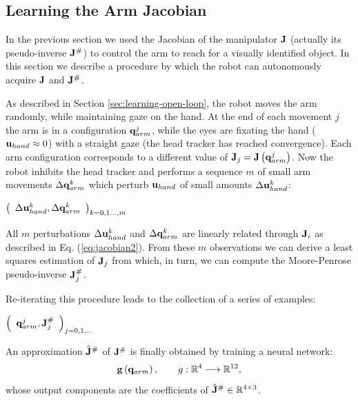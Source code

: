 \subsection{Learning the Arm Jacobian}
%
In the previous section we used the Jacobian of the manipulator
$\mathbf J$ (actually its pseudo-inverse $\mathbf J^\#$) to 
control the arm to reach for a visually identified object. In 
this section we describe a procedure by which the robot can 
autonomously acquire $\mathbf J$ and $\mathbf J^\#$.

As described in Section \ref{sec:learning-open-loop}, the robot 
moves the arm randomly, while maintaining gaze on the hand. At 
the end of each movement $j$ the arm is in a configuration 
$\mathbf q_{arm}^j$,  while the eyes are fixating the hand 
($\mathbf{u}_{hand} \approx 0$) with a straight gaze
(the head tracker has reached convergence). Each 
arm configuration corresponds to a different value of 
$\mathbf J_j=\mathbf J\left(\mathbf q_{arm}^j\right)$. 
Now the robot inhibits the head tracker and performs a sequence $m$
of small arm movements $\Delta \mathbf {q}_{arm}^k$ which perturb 
$\mathbf{u}_{hand}$ of small amounts $\Delta \mathbf {u}_{hand}^k$:
%
\begin{center}
\begin{math}
  \left(\begin{array}{cc}
    \Delta \mathbf {u}_{hand}^k , 
	\Delta \mathbf {q}_{arm}^k \end{array}
  \right)_{k = 0,1\dots,m}
\end{math}
\end{center}
%
All $m$ perturbations $\Delta \mathbf {u}_{hand}^k$ and 
$\Delta \mathbf {q}_{arm}^k$ are linearly related through $\mathbf J_i$ 
as described in Eq. (\ref{eq:jacobian2}). From these $m$ 
observations we can derive a least squares estimation of $\mathbf J_j$ from 
which, in turn, we can compute the Moore-Penrose pseudo-inverse $\mathbf J_j^\#$. 

Re-iterating this procedure leads to the collection of a series of examples:
%
\begin{center}
\begin{math}
  \left(\begin{array}{cc}
    \mathbf q_{arm}^j , \mathbf J_j^\# \end{array}\right)_{j = 0,1\dots}
\end{math}
\end{center}
%
An approximation $\hat{\mathbf J}^\#$ of $\mathbf J^\#$ is finally
obtained by training a neural network:
%
\begin{equation}
\mathbf{g}\left(\mathbf q_{arm}\right), \qquad g : \mathbb R^4 \longrightarrow \mathbb R^{12},
\end{equation}
%
whose output components are the coefficients of 
$\hat{\mathbf J}^\# \in \mathbb R^{4 \times 3}$.

